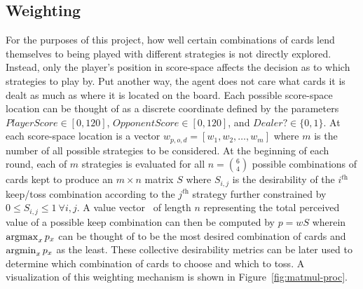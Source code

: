 

\subsection{Weighting}
\label{sec:dm-methods-weighting}



For the purposes of this project,
how well certain combinations of cards lend themselves to being played with 
different strategies is not directly explored.
%
Instead, only the player's position in score-space affects the decision as to
which strategies to play by.
%
Put another way, the agent does not care what cards it is dealt as much as where
it is located on the board.
%
Each possible score-space location can be thought of as a discrete coordinate
defined by the parameters
$\textit{PlayerScore} \in [0, 120]$,
$\textit{OpponentScore} \in [0, 120]$,
and
$\textit{Dealer?} \in \{0,1\}$.
%
At each score-space location is a vector $w_{p,o,d} = [w_1,w_2,\ldots,w_m]$
where $m$ is the number of all possible strategies to be considered.
At the beginning of each round, each of $m$ strategies is evaluated for all
$n = {6 \choose 4}$ possible combinations of cards kept to produce an
$m \times n$ matrix $S$
where $S_{i,j}$ is the desirability of the $i^{\textit{th}}$ keep/toss
combination according to the $j^{\textit{th}}$ strategy
further constrained by
$0 \le S_{i,j} \le 1\ \forall i,j$.
%
A value vector \pvec\ of length $n$ representing the total perceived value of a
possible keep combination
can then be computed by
$p = w S$
wherein $\operatorname*{argmax}_{x}{p_x}$ can be thought of to be the most desired combination
of cards and $\operatorname*{argmin}_{x}{p_x}$ as the least.
%
These collective desirability metrics can be later used to determine which
combination of cards to choose and which to toss.
%
A visualization of this weighting mechanism is shown in
Figure~\ref{fig:matmul-proc}.




